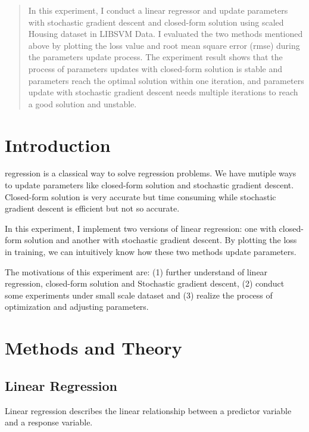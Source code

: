 \documentclass[journal, a4paper]{IEEEtran}
\begin{document}
\begin{abstract}
In this experiment, I conduct a linear regressor and update parameters with stochastic gradient descent and closed-form solution using scaled Housing dataset in LIBSVM Data. I evaluated the two methods mentioned above by plotting the loss value and root mean square error (rmse) during the parameters update process. The experiment result shows that the process of parameters updates with closed-form solution is stable and parameters reach the optimal solution within one iteration, and parameters update with stochastic gradient descent needs multiple iterations to reach a good solution and unstable.

\end{abstract}

\section{Introduction}
 regression is a classical way to solve regression problems. We have mutiple ways to update parameters like closed-form solution and stochastic gradient descent. Closed-form solution is very accurate but time consuming while stochastic gradient descent is efficient but not so accurate. 

In this experiment, I implement two versions of linear regression: one with closed-form solution and another with stochastic gradient descent. By plotting the loss in training, we can intuitively know how these two methods update parameters.

The motivations of this experiment are: (1) further understand of linear regression, closed-form solution and Stochastic gradient descent, (2) conduct some experiments under small scale dataset and (3) realize the process of optimization and adjusting parameters.

\section{Methods and Theory}
\subsection{Linear Regression}
Linear regression describes the linear relationship between a predictor variable and a response variable.
\end{document}
